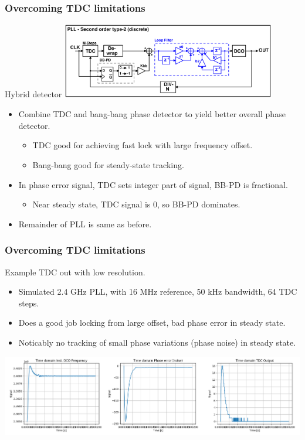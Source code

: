 \documentclass[t, screen, aspectratio=43]{beamer}
\begin{document}
\begin{frame}
	\frametitle{Overcoming TDC limitations}
	\begin{block}{Hybrid detector}
		\center\includegraphics[width=0.7\textwidth, angle=0]{pll_sec_order_bb.pdf}
		\begin{itemize}
			\scriptsize
			\item Combine TDC and bang-bang phase detector to yield better overall phase detector.
			\begin{itemize}
				\scriptsize
				\item TDC good for achieving fast lock with large frequency offset.
				\item Bang-bang good for steady-state tracking. 
			\end{itemize}	
			\item In phase error signal, TDC sets integer part of signal, BB-PD is fractional.
			\begin{itemize}
				\scriptsize
				\item Near steady state, TDC signal is 0, so BB-PD dominates.
			\end{itemize}	
			\item Remainder of PLL is same as before.
		\end{itemize}	
	\end{block}
\end{frame}

\begin{frame}
	\frametitle{Overcoming TDC limitations}
	\begin{block}{Example TDC out with low resolution.}
		\begin{itemize}
			\scriptsize
			\item Simulated 2.4 GHz PLL, with 16 MHz reference, 50 kHz bandwidth, 64 TDC steps.
			\item Does a good job locking from large offset, bad phase error in steady state.
			\item Noticably no tracking of small phase variations (phase noise) in steady state.
		\end{itemize} 	

		\center\includegraphics[width=1.0\textwidth, angle=0]{pllsim.png}
	\end{block}
\end{frame}
\end{document}
